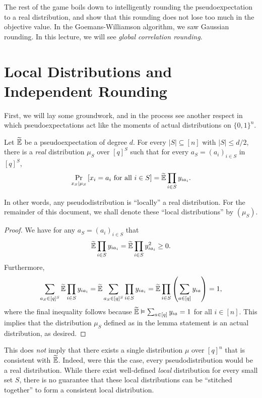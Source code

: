 \documentclass{article}
\begin{document}
The rest of the game boils down to intelligently rounding the pseudoexpectation to a real distribution, and show that this rounding does not lose too much in the objective value. In the Goemans-Williamson algorithm, we saw Gaussian rounding. In this lecture, we will see \emph{global correlation rounding}. 

\section{Local Distributions and Independent Rounding}

First, we will lay some groundwork, and in the process see another respect in which pseudoexpectations act like the moments of actual distributions on $\{0,1\}^n$.

\begin{flem}
	Let $\widetilde{\mathbb{E}}$ be a pseudoexpectation of degree $d$. For every $|S| \subseteq [n]$ with $|S| \leq d/2$, there is a \emph{real} distribution $\mu_S$ over $[q]^S$ such that for every $a_S = (a_i)_{i \in S}$ in $[q]^S$,
	\[ \Pr_{x_S \mid \mu_S} \left[ x_i = a_i \text{ for all } i \in S \right] = \widetilde{\mathbb{E}} \prod_{i \in S} y_{i a_i}. \]
\end{flem}
In other words, any pseudodistribution is ``locally'' a real distribution. For the remainder of this document, we shall denote these ``local distributions'' by $(\mu_S)$.
\begin{proof}
	We have for any $a_S = (a_i)_{i \in S}$ that
	\[ \widetilde{\mathbb{E}} \prod_{i \in S} y_{i a_i} = \widetilde{\mathbb{E}} \prod_{i \in S} y_{i a_i}^2 \ge 0. \]
	Furthermore,
	\[ \sum_{a_S \in [q]^S} \widetilde{\mathbb{E}} \prod_{i \in S} y_{i a_i} = \widetilde{\mathbb{E}} \sum_{a_S \in [q]^S} \prod_{i \in S} y_{i a_i} = \widetilde{\mathbb{E}} \prod_{i \in S} \left( \sum_{a \in [q]} y_{ia} \right) = 1, \]
	where the final inequality follows because $\widetilde{\mathbb{E}} \vDash \sum_{a \in [q]} y_{ia} = 1$ for all $i \in [n]$.
	This implies that the distribution $\mu_S$ defined as in the lemma statement is an actual distribution, as desired.
\end{proof}

\begin{remark}
	This does \emph{not} imply that there exists a single distribution $\mu$ over $[q]^n$ that is consistent with $\widetilde{\mathbb{E}}$. Indeed, were this the case, every pseudodistribution would be a real distribution. While there exist well-defined \emph{local} distribution for every small set $S$, there is no guarantee that these local distributions can be ``stitched together'' to form a consistent local distribution.
\end{remark}
\end{document}

